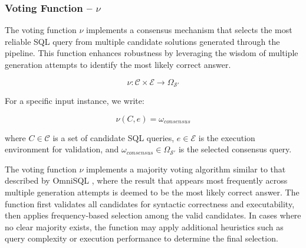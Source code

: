 \subsubsection{Voting Function – $\nu$}\label{design:voting-function}

The voting function $\nu$ implements a consensus mechanism that selects the most
reliable SQL query from multiple candidate solutions generated through the pipeline.
This function enhances robustness by leveraging the wisdom of multiple generation
attempts to identify the most likely correct answer.

$$
\nu: \mathcal{C} \times \mathcal{E} \rightarrow \Omega_{\mathcal{S}'}
$$

\vspace{0.5em}

For a specific input instance, we write:

$$
\nu(C, e) = \omega_{consensus}
$$

where $C \in \mathcal{C}$ is a set of candidate SQL queries, $e \in \mathcal{E}$ is
the execution environment for validation, and $\omega_{consensus} \in \Omega_{\mathcal{S}'}$
is the selected consensus query.

\vspace{0.5em}

The voting function $\nu$ implements a majority voting algorithm similar to that
described by OmniSQL \citep{OmniSQL}, where the result that appears most frequently
across multiple generation attempts is deemed to be the most likely correct answer.
The function first validates all candidates for syntactic correctness and executability,
then applies frequency-based selection among the valid candidates. In cases where
no clear majority exists, the function may apply additional heuristics such as query
complexity or execution performance to determine the final selection.
